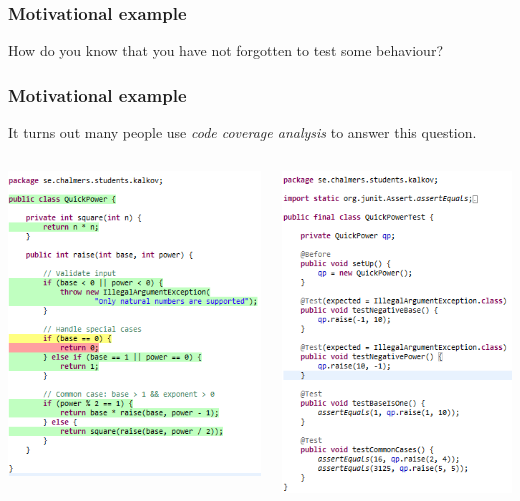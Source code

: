 \documentclass{beamer}
\begin{document}
\begin{frame}
  \frametitle{Motivational example}
\centering
How do you know that you have not forgotten to test some behaviour?
\end{frame}

\begin{frame}
  \frametitle{Motivational example}
\centering
It turns out many people use \emph{code coverage analysis} to answer this question.
\pause
\begin{columns}[T]
\begin{column}{.5\textwidth}
  \centering
    \includegraphics[scale=0.5]{QuickPower_colored.png}
\end{column}
\begin{column}{.5\textwidth}
  \centering
    \includegraphics[scale=0.5]{QuickPowerTest.png}
\end{column}
\end{columns}
\end{frame}
\end{document}
